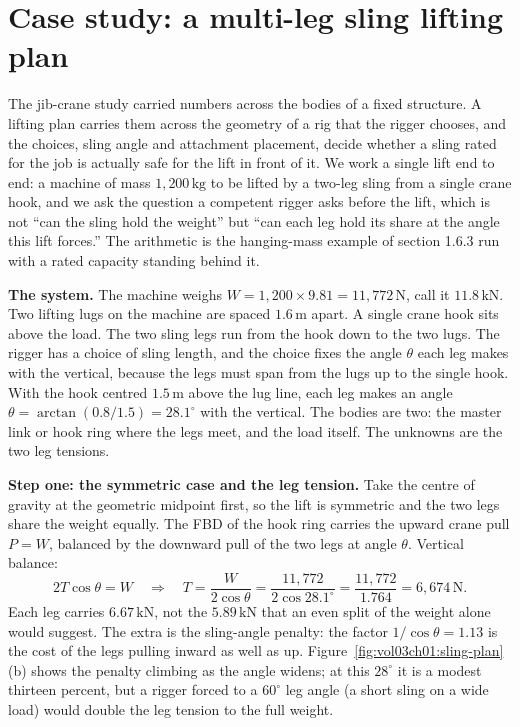 \section{Case study: a multi-leg sling lifting plan}

The jib-crane study carried numbers across the bodies of a fixed structure.
A lifting plan carries them across the geometry of a rig that the rigger
chooses, and the choices, sling angle and attachment placement, decide
whether a sling rated for the job is actually safe for the lift in front of
it. We work a single lift end to end: a machine of mass $1{,}200\,\si{
\kilogram}$ to be lifted by a two-leg sling from a single crane hook, and we
ask the question a competent rigger asks before the lift, which is not ``can
the sling hold the weight'' but ``can each leg hold its share at the angle
this lift forces.'' The arithmetic is the hanging-mass example of section
1.6.3 run with a rated capacity standing behind it.



\textbf{The system.} The machine weighs $W = 1{,}200 \times 9.81 = 11{,}772
\,\text{N}$, call it $11.8\,\text{kN}$. Two lifting lugs on the machine are
spaced $1.6\,\si{\meter}$ apart. A single crane hook sits above the load. The
two sling legs run from the hook down to the two lugs. The rigger has a
choice of sling length, and the choice fixes the angle $\theta$ each leg
makes with the vertical, because the legs must span from the lugs up to the
single hook. With the hook centred $1.5\,\si{\meter}$ above the lug line,
each leg makes an angle $\theta = \arctan(0.8/1.5) = 28.1^{\circ}$ with the
vertical. The bodies are two: the master link or hook ring where the legs
meet, and the load itself. The unknowns are the two leg tensions.

\textbf{Step one: the symmetric case and the leg tension.} Take the centre
of gravity at the geometric midpoint first, so the lift is symmetric and the
two legs share the weight equally. The FBD of the hook ring carries the
upward crane pull $P = W$, balanced by the downward pull of the two legs at
angle $\theta$. Vertical balance:
\[
2T\cos\theta = W \quad\Longrightarrow\quad
T = \frac{W}{2\cos\theta} = \frac{11{,}772}{2\cos 28.1^{\circ}}
= \frac{11{,}772}{1.764} = 6{,}674\,\text{N}.
\]
Each leg carries $6.67\,\text{kN}$, not the $5.89\,\text{kN}$ that an even
split of the weight alone would suggest. The extra is the sling-angle
penalty: the factor $1/\cos\theta = 1.13$ is the cost of the legs pulling
inward as well as up. Figure~\ref{fig:vol03ch01:sling-plan}(b) shows the
penalty climbing as the angle widens; at this $28^{\circ}$ it is a modest
thirteen percent, but a rigger forced to a $60^{\circ}$ leg angle (a short
sling on a wide load) would double the leg tension to the full weight.

